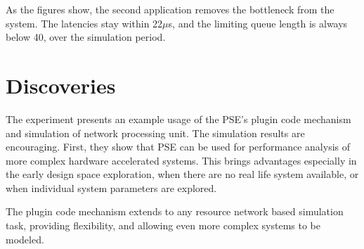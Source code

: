 As the figures show, the second application removes the bottleneck from the system. The latencies stay within 22$\mu$s, and the limiting queue length is always below 40, over the simulation period.

\section{Discoveries}

The experiment presents an example usage of the PSE's plugin code mechanism and simulation of network processing unit. The simulation results are encouraging. First, they show that PSE can be used for performance analysis of more complex hardware accelerated systems. This brings advantages especially in the early design space exploration, when there are no real life system available, or when individual system parameters are explored.

The plugin code mechanism extends to any resource network based simulation task, providing flexibility, and allowing even more complex systems to be modeled.

